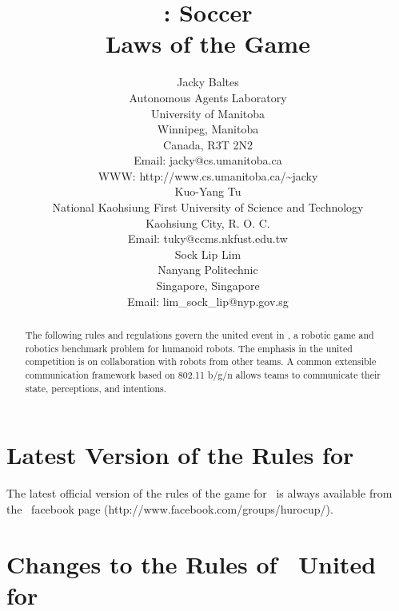 \documentclass[12pt]{hurocup}
\begin{document}
\title{\HuroCup: Soccer\\
Laws of the Game \thisyear}

\author{Jacky Baltes\\
Autonomous Agents Laboratory\\
University of Manitoba\\
Winnipeg, Manitoba\\
Canada, R3T 2N2\\
Email: jacky@cs.umanitoba.ca\\
WWW: http://www.cs.umanitoba.ca/\~{ }jacky\\[5mm]
Kuo-Yang Tu\\
National Kaohsiung First University of Science and Technology\\
Kaohsiung City, R. O. C.\\
Email: tuky@ccms.nkfust.edu.tw\\[5mm]
Sock Lip Lim\\
Nanyang Politechnic\\
Singapore, Singapore\\
Email: lim\_sock\_lip@nyp.gov.sg 
}

\maketitle
\begin{abstract}
The following rules and regulations govern the united event in
\HuroCup, a robotic game and robotics benchmark problem for humanoid
robots. The emphasis in the united competition is on collaboration
with robots from other teams. A common extensible communication
framework based on 802.11 b/g/n allows teams to communicate their
state, perceptions, and intentions.
%
\end{abstract}

\section*{Latest Version of the Rules for \HuroCup}
\label{sec:updates}

The latest official version of the rules of the game for \HuroCup\ is
always available from the \HuroCup\ facebook page
(http://www.facebook.com/groups/hurocup/).

\section*{Changes to the Rules of \HuroCup\ United for \thisyear}
\end{document}
